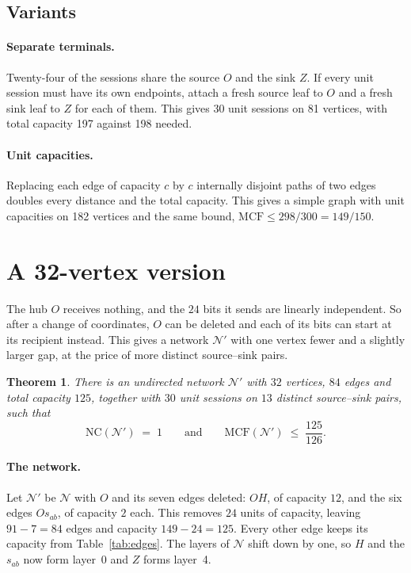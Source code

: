 \documentclass[11pt]{article}
\newtheorem{theorem}{Theorem}
\newcommand{\NC}{\mathrm{NC}}
\newcommand{\MCF}{\mathrm{MCF}}
\begin{document}
\subsection{Variants}\label{app:variants}

\paragraph{Separate terminals.} Twenty-four of the sessions share the source $O$ and the sink $Z$. If every unit session must have its own endpoints, attach a fresh source leaf to $O$ and a fresh sink leaf to $Z$ for each of them. This gives 30 unit sessions on 81 vertices, with total capacity 197 against 198 needed.

\paragraph{Unit capacities.} Replacing each edge of capacity $c$ by $c$ internally disjoint paths of two edges doubles every distance and the total capacity. This gives a simple graph with unit capacities on 182 vertices and the same bound, $\MCF\le298/300=149/150$.

\section{A 32-vertex version}\label{app:32}

The hub $O$ receives nothing, and the $24$ bits it sends are linearly independent. So after a change of coordinates, $O$ can be deleted and each of its bits can start at its recipient instead. This gives a network $\mathcal N'$ with one vertex fewer and a slightly larger gap, at the price of more distinct source--sink pairs.

\begin{theorem}\label{thm:32}
There is an undirected network $\mathcal N'$ with $32$ vertices, $84$ edges and total capacity $125$, together with $30$ unit sessions on $13$ distinct source--sink pairs, such that
\[
\NC(\mathcal N')\;=\;1
\qquad\text{and}\qquad
\MCF(\mathcal N')\;\le\;\frac{125}{126}.
\]
\end{theorem}

\paragraph{The network.} Let $\mathcal N'$ be $\mathcal N$ with $O$ and its seven edges deleted: $OH$, of capacity $12$, and the six edges $Os_{ab}$, of capacity $2$ each. This removes $24$ units of capacity, leaving $91-7=84$ edges and capacity $149-24=125$. Every other edge keeps its capacity from Table~\ref{tab:edges}. The layers of $\mathcal N$ shift down by one, so $H$ and the $s_{ab}$ now form layer~0 and $Z$ forms layer~4.
\end{document}
